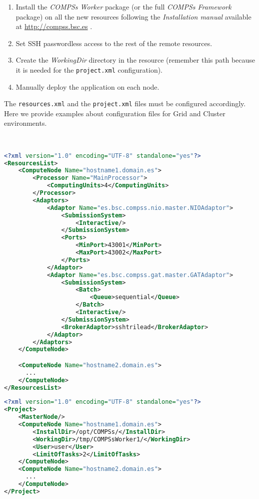 \begin{enumerate}
 \item Install the \textit{COMPSs Worker} package (or the full \textit{COMPSs Framework} package) on all the new
 resources following the \textit{Installation manual} available at \url{http://compss.bsc.es} .
 \item Set SSH passwordless access to the rest of the remote resources.
 \item Create the \textit{WorkingDir} directory in the resource (remember this path because it is needed
 for the \texttt{project.xml} configuration).
 \item Manually deploy the application on each node.
\end{enumerate}

The \texttt{resources.xml} and the \texttt{project.xml} files must be configured accordingly.
Here we provide examples about configuration files for Grid and Cluster environments.

~ \newline

\begin{lstlisting}[language=xml]
<?xml version="1.0" encoding="UTF-8" standalone="yes"?>
<ResourcesList>
    <ComputeNode Name="hostname1.domain.es">
        <Processor Name="MainProcessor">
            <ComputingUnits>4</ComputingUnits>
        </Processor>
        <Adaptors>
            <Adaptor Name="es.bsc.compss.nio.master.NIOAdaptor">
                <SubmissionSystem>
                    <Interactive/>
                </SubmissionSystem>
                <Ports>
                    <MinPort>43001</MinPort>
                    <MaxPort>43002</MaxPort>
                </Ports>
            </Adaptor>
            <Adaptor Name="es.bsc.compss.gat.master.GATAdaptor">
                <SubmissionSystem>
                    <Batch>
                        <Queue>sequential</Queue>
                    </Batch>
                    <Interactive/>
                </SubmissionSystem>
                <BrokerAdaptor>sshtrilead</BrokerAdaptor>
            </Adaptor>
        </Adaptors>
    </ComputeNode>

    <ComputeNode Name="hostname2.domain.es">
      ...
    </ComputeNode>
</ResourcesList>
\end{lstlisting}

\newpage

\begin{lstlisting}[language=xml]
<?xml version="1.0" encoding="UTF-8" standalone="yes"?>
<Project>
    <MasterNode/>
    <ComputeNode Name="hostname1.domain.es">
        <InstallDir>/opt/COMPSs/</InstallDir>
        <WorkingDir>/tmp/COMPSsWorker1/</WorkingDir>
        <User>user</User>
        <LimitOfTasks>2</LimitOfTasks>
    </ComputeNode>
    <ComputeNode Name="hostname2.domain.es">
      ...
    </ComputeNode>
</Project>
\end{lstlisting}


